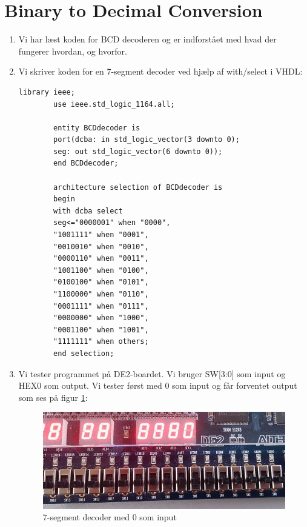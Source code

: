 \section{Binary to Decimal Conversion}
\begin{enumerate}
	\item[1)]
	Vi har læst koden for BCD decoderen og er indforstået med hvad der fungerer hvordan, og hvorfor.\newline
	
	\item[2)]
	Vi skriver koden for en 7-segment decoder ved hjælp af with/select i VHDL:\\
		\begin{lstlisting}[caption={BCD til 7 segment decoder},label={lst:bcdTo7SegDecoder}]
		library ieee;
		use ieee.std_logic_1164.all;
		
		entity BCDdecoder is
		port(dcba: in std_logic_vector(3 downto 0);
		seg: out std_logic_vector(6 downto 0));
		end BCDdecoder;
		
		architecture selection of BCDdecoder is
		begin
		with dcba select
		seg<="0000001" when "0000",
		"1001111" when "0001",
		"0010010" when "0010",
		"0000110" when "0011",
		"1001100" when "0100",
		"0100100" when "0101",
		"1100000" when "0110",
		"0001111" when "0111",
		"0000000" when "1000",
		"0001100" when "1001",
		"1111111" when others;
		end selection;	
		\end{lstlisting}
		
\item[3)]
	Vi tester programmet på DE2-boardet. Vi bruger SW[3:0] som input og HEX0 som output. Vi tester først med 0 som input og får forventet output som ses på figur \ref{fig:7SegDecoder0}:
	\begin{figure}[h]
		\centering
		\includegraphics[scale=0.6]{pictures/Oevelse4/BCD_decoder/BCD_1seg_0.jpg}
		\caption{7-segment decoder med 0 som input}
		\label{fig:7SegDecoder0}
	\end{figure}


\end{enumerate}

